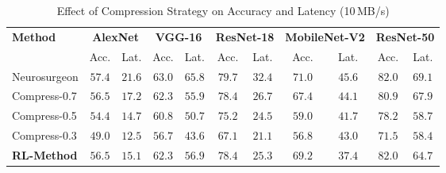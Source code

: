\begin{table}[htbp]
\centering
\caption{Effect of Compression Strategy on Accuracy and Latency (10\,MB/s)}
\label{tab:compression}
\begin{tabular}{lcccccccccc}
\toprule
\textbf{Method} & \multicolumn{2}{c}{\textbf{AlexNet}} & \multicolumn{2}{c}{\textbf{VGG-16}} & \multicolumn{2}{c}{\textbf{ResNet-18}} & \multicolumn{2}{c}{\textbf{MobileNet-V2}} & \multicolumn{2}{c}{\textbf{ResNet-50}} \\
\cmidrule(lr){2-3}\cmidrule(lr){4-5}\cmidrule(lr){6-7}\cmidrule(lr){8-9}\cmidrule(lr){10-11}
& Acc. & Lat. & Acc. & Lat. & Acc. & Lat. & Acc. & Lat. & Acc. & Lat. \\
\midrule
Neurosurgeon & $57.4$ & $21.6$ & $63.0$ & $65.8$ & $79.7$ & $32.4$ & $71.0$ & $45.6$ & $82.0$ & $69.1$ \\
Compress-0.7 & $56.5$ & $17.2$ & $62.3$ & $55.9$ & $78.4$ & $26.7$ & $67.4$ & $44.1$ & $80.9$ & $67.9$ \\
Compress-0.5 & $54.4$ & $14.7$ & $60.8$ & $50.7$ & $75.2$ & $24.5$ & $59.0$ & $41.7$ & $78.2$ & $58.7$ \\
Compress-0.3 & $49.0$ & $12.5$ & $56.7$ & $43.6$ & $67.1$ & $21.1$ & $56.8$ & $43.0$ & $71.5$ & $58.4$ \\
\textbf{RL-Method} & $56.5$ & $15.1$ & $62.3$ & $56.9$ & $78.4$ & $25.3$ & $69.2$ & $37.4$ & $82.0$ & $64.7$ \\
\bottomrule
\end{tabular}
\end{table}